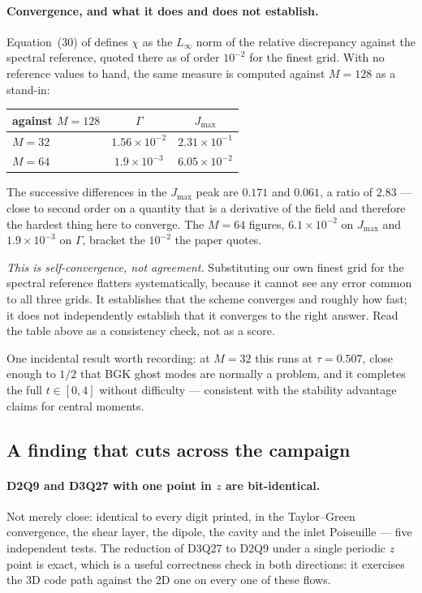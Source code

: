 \documentclass[11pt,a4paper]{article}
\newcommand{\e}[1]{\times 10^{#1}}
\begin{document}
\paragraph{Convergence, and what it does and does not establish.} Equation~(30)
of \cite{derosis2017pre} defines $\chi$ as the $L_\infty$ norm of the relative
discrepancy against the spectral reference, quoted there as of order $10^{-2}$
for the finest grid. With no reference values to hand, the same measure is
computed against $M=128$ as a stand-in:
\begin{center}\small
\begin{tabular}{lcc}
\toprule
against $M=128$ & $\Gamma$ & $J_{\max}$ \\
\midrule
$M=32$ & $1.56\e{-2}$ & $2.31\e{-1}$ \\
$M=64$ & $1.9\e{-3}$  & $6.05\e{-2}$ \\
\bottomrule
\end{tabular}
\end{center}
\noindent The successive differences in the $J_{\max}$ peak are $0.171$ and
$0.061$, a ratio of $2.83$ --- close to second order on a quantity that is a
derivative of the field and therefore the hardest thing here to converge. The
$M=64$ figures, $6.1\e{-2}$ on $J_{\max}$ and $1.9\e{-3}$ on $\Gamma$, bracket
the $10^{-2}$ the paper quotes.

\emph{This is self-convergence, not agreement.} Substituting our own finest grid
for the spectral reference flatters systematically, because it cannot see any
error common to all three grids. It establishes that the scheme converges and
roughly how fast; it does not independently establish that it converges to the
right answer. Read the table above as a consistency check, not as a score.

\medskip
\noindent One incidental result worth recording: at $M=32$ this runs at
$\tau=0.507$, close enough to $1/2$ that BGK ghost modes are normally a problem,
and it completes the full $t\in[0,4]$ without difficulty --- consistent with the
stability advantage \cite{derosis2017pre} claims for central moments.

\subsection{A finding that cuts across the campaign}

\paragraph{D2Q9 and D3Q27 with one point in $z$ are bit-identical.} Not merely
close: identical to every digit printed, in the Taylor--Green convergence, the
shear layer, the dipole, the cavity and the inlet Poiseuille --- five
independent tests. The reduction of D3Q27 to D2Q9 under a single periodic $z$
point is exact, which is a useful correctness check in both directions: it
exercises the 3D code path against the 2D one on every one of these flows.
\end{document}
